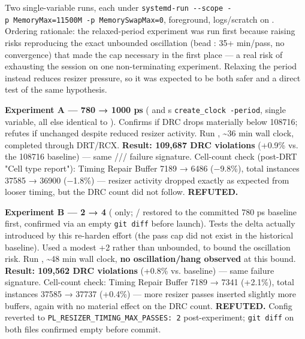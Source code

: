 \begin{record}

Two single-variable runs, each under
\texttt{systemd-\allowbreak{}run\ -\allowbreak{}-\allowbreak{}scope\ -\allowbreak{}p\ MemoryMax=\allowbreak{}11500M\ -\allowbreak{}p\ MemorySwapMax=\allowbreak{}0},
foreground, logs/\allowbreak{}scratch on . Ordering
rationale: the relaxed-period experiment was run first because raising
 risks reproducing the exact
unbounded  oscillation (bead : 35+
min/pass, no convergence) that made the cap necessary in the first place
--- a real risk of exhausting the session on one non-terminating
experiment. Relaxing the period instead reduces resizer pressure, so it
was expected to be both safer and a direct test of the same hypothesis.

\textbf{Experiment A ---  780 → 1000 ps}
(  and
\textquotesingle s
\texttt{create\_\allowbreak{}clock\ -\allowbreak{}period}, single
variable, all else identical to ).
Confirms if DRC drops materially below 108716; refutes if unchanged
despite reduced resizer activity. Run ,
\textasciitilde36 min wall clock, completed through DRT/RCX.
\textbf{Result: 109,687 DRC violations} (+0.9\% vs. the 108716 baseline)
--- same
///
failure signature. Cell-count check (post-DRT "Cell type report"):
Timing Repair Buffer 7189 → 6486 (−9.8\%), total instances 37585 → 36900
(−1.8\%) --- resizer activity dropped exactly as expected from looser
timing, but the DRC count did not follow. \textbf{REFUTED.}

\textbf{Experiment B ---  2 → 4}
( only; /  restored
to the committed 780 ps baseline first, confirmed via an empty
\texttt{git\ diff} before launch). Tests the delta actually introduced
by this re-harden effort (the pass cap did not exist in the historical
 baseline). Used a modest +2 rather than unbounded, to bound
the oscillation risk. Run ,
\textasciitilde48 min wall clock, \textbf{no
oscillation/\allowbreak{}hang observed} at this bound. \textbf{Result:
109,562 DRC violations} (+0.8\% vs. baseline) --- same failure
signature. Cell-count check: Timing Repair Buffer 7189 → 7341 (+2.1\%),
total instances 37585 → 37737 (+0.4\%) --- more resizer passes inserted
slightly more buffers, again with no material effect on the DRC count.
\textbf{REFUTED.} Config reverted to
\texttt{PL\_\allowbreak{}RESIZER\_\allowbreak{}TIMING\_\allowbreak{}MAX\_\allowbreak{}PASSES:\allowbreak{}\ 2}
post-experiment; \texttt{git\ diff} on both files confirmed empty before
commit.


\end{record}
